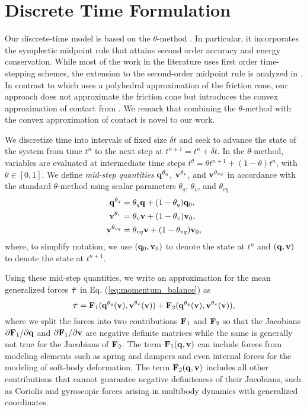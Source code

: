 \section{Discrete Time Formulation}
\label{sec:discrete_time_formulation}

Our discrete-time model is based on the $\theta\text{-method}$ \cite[\S
II.7]{bib:hairer2008solving}. In particular, it incorporates the symplectic
midpoint rule that attains second order accuracy and energy conservation. While
most of the work in the literature uses first order time-stepping schemes, the
extension to the second-order midpoint rule is analyzed in
\cite{bib:potra2006linearly}. In contrast to \cite{bib:potra2006linearly} which
uses a polyhedral approximation of the friction cone, our approach does not approximate the friction cone but introduces
the convex approximation of contact from \cite{bib:anitescu2006}. We
remark that combining the $\theta\text{-method}$ with the convex approximation
of contact is novel to our work. 

We discretize time into intervals of fixed size $\delta t$ and seek to advance the
state of the system from time $t^n$ to the next step at $t^{n+1} = t^n + \delta t$. In
the $\theta\text{-method}$, variables are evaluated at intermediate time steps
$t^\theta = \theta t^{n+1}+(1-\theta)t^{n}$, with $\theta \in [0, 1]$. We define
\emph{mid-step quantities} ${\mathbf{q}}^{\theta_{q}}$, ${\mathbf{v}}^{\theta_{v}}$, and
${\mathbf{v}}^{\theta_{vq}}$ in accordance with the standard $\theta\text{-method}$
using scalar parameters $\theta_q$, $\theta_v$, and $\theta_{vq}$
\begin{align}
	\mf{q}^{\theta_q} &= \theta_q\mf{q} + (1-\theta_{q})\mf{q}_0,\nonumber\\
	\mf{v}^{\theta_v} &= \theta_v\mf{v} + (1-\theta_v)\mf{v}_0,\nonumber\\
	\mf{v}^{\theta_{vq}} &= \theta_{vq}\mf{v} + (1-\theta_{vq})\mf{v}_0,
	\label{eq:theta_method}
\end{align}
where, to simplify notation, we use $({\mathbf{q}}_0, {\mathbf{v}}_0)$ to denote the state
at $t^n$ and $({\mathbf{q}}, {\mathbf{v}})$ to denote the state at $t^{n+1}$.

Using these mid-step quantities, we write an approximation for the mean
generalized forces $\bar{{\bm{\tau}}}$ in Eq. (\ref{eq:momentum_balance}) as
\begin{equation*}
	\bar{{\bm{\tau}}} = {\mathbf{F}}_1({\mathbf{q}}^{\theta_{q}}({\mathbf{v}}), {\mathbf{v}}^{\theta_v}({\mathbf{v}}))+
	{\mathbf{F}}_2({\mathbf{q}}^{\theta_{q}}({\mathbf{v}}), {\mathbf{v}}^{\theta_v}({\mathbf{v}})),
\end{equation*}
where we split the forces into two contributions ${\mathbf{F}}_1$ and ${\mathbf{F}}_2$ so that
the Jacobians $\partial {\mathbf{F}}_1/\partial{\mathbf{q}}$ and $\partial
{\mathbf{F}}_1/\partial{\mathbf{v}}$ are negative definite matrices while the same is
generally not true for the Jacobians of ${\mathbf{F}}_2$. The term ${\mathbf{F}}_1({\mathbf{q}},
{\mathbf{v}})$ can include forces from modeling elements such as spring and dampers and even
internal forces for the modeling of soft-body deformation. The term
${\mathbf{F}}_2({\mathbf{q}}, {\mathbf{v}})$ includes all other contributions that cannot guarantee
negative definiteness of their Jacobians, such as Coriolis and gyroscopic forces
arising in multibody dynamics with generalized coordinates.

